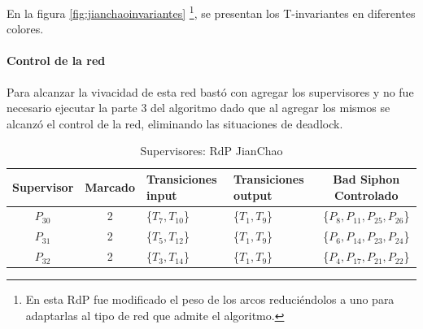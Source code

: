 En la figura \ref{fig:jianchaoinvariantes} \footnote{En esta RdP fue modificado el peso de los arcos reduciéndolos a uno para adaptarlas al tipo de red que admite el algoritmo.}, se presentan los T-invariantes en diferentes colores.\\

\paragraph{Control de la red}
\hfill \break
Para alcanzar la vivacidad de esta red bastó con agregar los supervisores y no fue necesario ejecutar la parte 3 del algoritmo dado que al agregar los mismos se alcanzó el control de la red, eliminando las situaciones de deadlock.
\begin{table}[H]
    \small
    \centering
    \begin{tabular}{|c|c|P{2cm}|P{2.3cm}|c|}
    \hline
    \textbf{Supervisor} & \textbf{Marcado} & \textbf{Transiciones input} & \textbf{Transiciones output} & \textbf{Bad Siphon Controlado}  \\  \hline
    $P_{30}$ & 2 & \{$T_{7},T_{10}$\} & \{$T_{1},T_{9}$\} & \{$P_8, P_{11}, P_{25}, P_{26}$\} \\ 
    \hline
    $P_{31}$ & 2 & \{$T_{5}, T_{12}$\} & \{$T_1,T_9$\} & \{$P_6, P_{14}, P_{23}, P_{24}$\} \\ 
    \hline
    $P_{32}$ & 2 & \{$T_{3}, T_{14}$\} & \{$T_1,T_9$\} & \{$P_4, P_{17}, P_{21}, P_{22}$\} \\ 
    \hline
    \end{tabular}
    \caption{Supervisores: RdP JianChao}
    \label{tab:Jianchao}
\end{table}
\hfill

